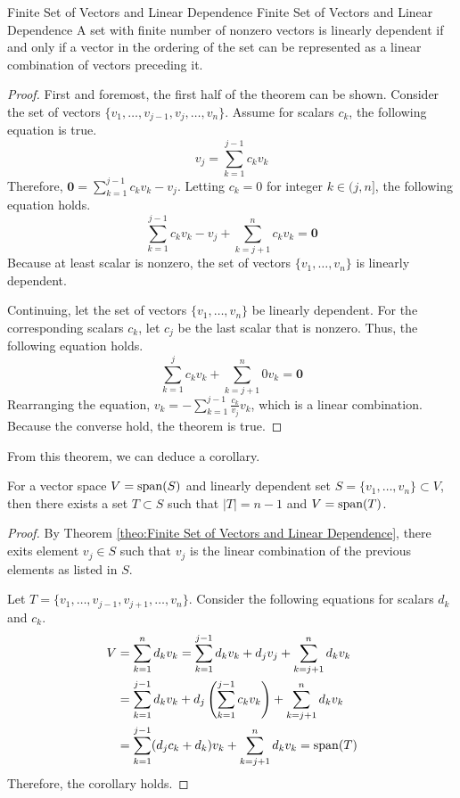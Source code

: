 \documentclass[../main.tex]{subfiles}
\begin{document}
\begin{theorem}{Finite Set of Vectors and Linear Dependence}
{Finite Set of Vectors and Linear Dependence}
A set with finite number of nonzero vectors is linearly dependent
if and only if a vector in the ordering of the set can be represented
as a linear combination of vectors preceding it.
\end{theorem}
\begin{proof}
First and foremost, the first half of the theorem can be shown.
Consider the set of vectors $\{ v_1, \ldots, v_{j-1}, v_j, \ldots,
v_n \}$. Assume for scalars $c_k$, the following equation is true.
\[
v_j
= \sum_{k = 1}^{j-1} c_k v_k
\]
Therefore, $\mathbf{0} = \sum_{k = 1}^{j-1} c_k v_k - v_j$.
Letting $c_k = 0$ for integer $k \in (j, n]$, the following equation
holds.
\[
\sum_{k = 1}^{j-1} c_k v_k - v_j + \sum_{k = j+1}^{n} c_k v_k
= \mathbf{0}
\]
Because at least scalar is nonzero, the set of vectors $\{ v_1,
\ldots, v_n \}$ is linearly dependent.

Continuing, let the set of vectors $\{ v_1, \ldots, v_n \}$ be
linearly dependent. For the corresponding scalars $c_k$, let
$c_j$ be the last scalar that is nonzero. Thus, the following
equation holds.
\[
\sum_{k = 1}^{j} c_k v_k + \sum_{k = j+1}^{n} 0 v_k
= \mathbf{0}
\]
Rearranging the equation, $v_k = -\sum_{k = 1}^{j-1} \frac{c_k}{v_j}
v_k$, which is a linear combination. Because the converse hold,
the theorem is true.
\end{proof}

From this theorem, we can deduce a corollary.

\begin{corollary}{}{}
For a vector space $V = \operatorname{span}(S)$ and linearly dependent set
$S = \{ v_1, \ldots, v_n \} \subset V$, then there exists a set
$T \subset S$ such that $|T| = n - 1$ and $V = \operatorname{span}(T)$.
\end{corollary}
\begin{proof}
By Theorem \ref{theo:Finite Set of Vectors and Linear Dependence},
there exits element $v_j \in S$ such that $v_j$ is the linear
combination of the previous elements as listed in $S$.

Let $T = \{ v_1, \ldots, v_{j-1}, v_{j+1}, \ldots, v_n \}$.
Consider the following equations for scalars $d_k$ and $c_k$.
\begin{align*}
    V
    &= \sum_{k = 1}^n d_k v_k
    = \sum_{k = 1}^{j-1} d_k v_k + d_j v_j +
        \sum_{k = j+1}^n d_k v_k \\
    &= \sum_{k = 1}^{j-1} d_k v_k +
        d_j \left( \sum_{k = 1}^{j-1} c_k v_k \right) +
        \sum_{k = j+1}^n d_k v_k \\
    &= \sum_{k = 1}^{j-1} (d_j c_k + d_k) v_k +
        \sum_{k = j+1}^n d_k v_k
    = \operatorname{span}(T)
\end{align*}
Therefore, the corollary holds.
\end{proof}
\end{document}
